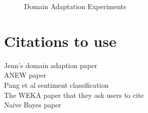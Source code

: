 \documentclass[letterpaper]{article}
\begin{document}
\begin{figure}
  \centering
  
  \caption{Domain Adaptation Experiments}
  \label{fig:domain-adaptation}
\end{figure}

\section{Citations to use}
Jenn's domain adaption paper \cite{JennLearnDiffDomains}\\
ANEW paper \cite{DoddsANEWPaper}\\
Pang et al sentiment classification \cite{PangSentimentClassification}\\
The WEKA paper that they ask users to cite \cite{weka} \\
Naive Bayes paper \cite{naivebayes}


\end{document}

